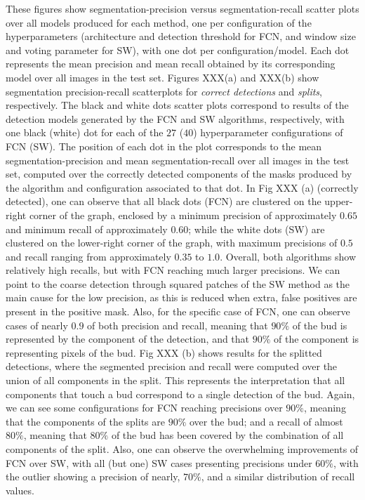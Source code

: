 \documentclass[a4paper,authoryear,review]{elsarticle}
\begin{document}
These figures show segmentation-precision versus segmentation-recall scatter plots over all models produced for each method, one per configuration of the hyperparameters (architecture and detection threshold for FCN, and window size and voting parameter for SW), with one dot per configuration/model. Each dot represents the mean precision and mean recall obtained by its corresponding model over all images in the test set. 
Figures XXX(a) and XXX(b) show segmentation precision-recall scatterplots for \emph{correct detections} and \emph{splits}, respectively. The black and white dots scatter plots correspond to results of the detection models generated by the FCN and SW algorithms, respectively, with one black (white) dot for each of the $27$ ($40$) hyperparameter configurations of FCN (SW). The position of each dot in the plot corresponds to the mean segmentation-precision and mean segmentation-recall over all images in the test set, computed over the correctly detected components of the masks produced by the algorithm and configuration associated to that dot.
In Fig XXX (a) (correctly detected), one can observe that all black dots (FCN) are clustered on the upper-right corner of the graph, enclosed by a minimum precision of approximately $0.65$ and minimum recall of approximately $0.60$; while the white dots (SW) are clustered on the lower-right corner of the graph, with maximum precisions of $0.5$ and recall ranging from approximately $0.35$ to $1.0$. Overall, both algorithms show relatively high recalls, but with FCN reaching much larger precisions. We can point to the coarse detection through squared patches of the SW method as the main cause for the low precision, as this is reduced when extra, false positives are present in the positive mask. Also, for the specific case of FCN, one can observe cases of nearly $0.9$ of both precision and recall, meaning that $90\%$ of the bud is represented by the component of the detection, and that $90\%$ of the component is representing pixels of the bud. 
Fig XXX (b) shows results for the splitted detections, where the segmented precision and recall were computed over the union of all components in the split. This represents the interpretation that all components that touch a bud correspond to a single detection of the bud. Again, we can see some configurations for FCN reaching precisions over $90\%$, meaning  that the components of the splits are $90\%$ over the bud; and a recall of almost $80\%$, meaning that $80\%$ of the bud has been covered by the combination of all components of the split. Also, one can observe the overwhelming improvements of FCN over SW, with all (but one) SW cases presenting precisions under $60\%$, with the outlier showing a precision of nearly,  $70\%$, and a similar distribution of recall values.  
\end{document}
